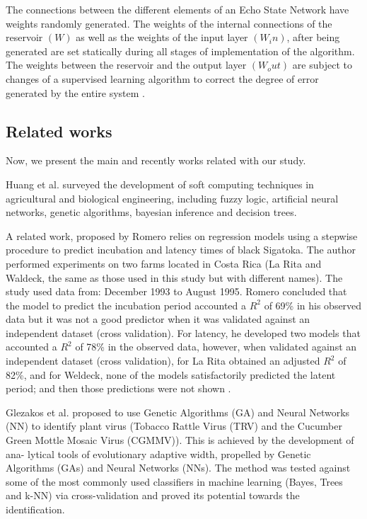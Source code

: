 \documentclass[review,authoryear,english]{elsarticle}
\begin{document}
The connections between the different elements of an Echo State Network have weights randomly generated. The weights of the internal connections of the reservoir $(W)$ as well as the weights of the input layer $(W_in)$, after being generated are set statically during all stages of implementation of the algorithm. The weights between the reservoir and the output layer $(W_out)$ are subject to changes of a supervised learning algorithm to correct the degree of error generated by the entire system \citep{Lukose2012}.

\subsection{Related works}
Now, we present the main and recently works related with our study.

Huang et al. \citep{Huang2010}  surveyed the development of soft computing techniques in agricultural and biological engineering, including fuzzy logic, artificial neural networks, genetic algorithms, bayesian inference and decision trees.

A related work, proposed by Romero \citep{Romero1995} relies on regression models using a stepwise procedure to predict incubation and latency times of black Sigatoka. The author performed experiments on two farms located in Costa Rica (La Rita and Waldeck, the same as those used in this study but with different names). The study used data from: December 1993 to August 1995. Romero concluded that the model to predict the incubation period accounted a $R^2$ of 69\% in his observed data but it was not a good predictor when it was validated against an independent dataset (cross validation). For latency, he developed two models that accounted a $R^2$ of 78\% in the observed data, however, when validated against an independent dataset (cross validation), for La Rita obtained an adjusted $R^2$ of 82\%, and for Weldeck, none of the models satisfactorily predicted the latent period; and then those predictions were not shown \citep{Romero1995}.

Glezakos et al. \citep{Glezakos2010} proposed to use Genetic Algorithms (GA) and Neural Networks (NN) to identify plant virus (Tobacco Rattle Virus (TRV) and the Cucumber Green Mottle Mosaic Virus (CGMMV)). This is achieved by the development of ana- lytical tools of evolutionary adaptive width, propelled by Genetic Algorithms (GAs) and Neural Networks (NNs). The method was tested against some of the most commonly used classifiers in machine learning (Bayes, Trees and k-NN) via cross-validation and proved its potential towards the identification. 
\end{document}
